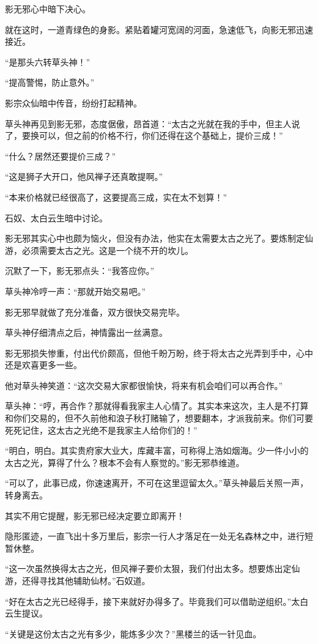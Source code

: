 \begin{this_body}
影无邪心中暗下决心。

就在这时，一道青绿色的身影。紧贴着罐河宽阔的河面，急速低飞，向影无邪迅速接近。

“是那头六转草头神！”

“提高警惕，防止意外。”

影宗众仙暗中传音，纷纷打起精神。

草头神再见到影无邪，态度倨傲，昂首道：“太古之光就在我的手中，但主人说了，要换可以，但之前的价格不行，你们还得在这个基础上，提价三成！”

“什么？居然还要提价三成？”

“这是狮子大开口，他风禅子还真敢提啊。”

“本来价格就已经很高了，这要提高三成，实在太不划算！”

石奴、太白云生暗中讨论。

影无邪其实心中也颇为恼火，但没有办法，他实在太需要太古之光了。要炼制定仙游，必须需要太古之光。这是一个绕不开的坎儿。

沉默了一下，影无邪点头：“我答应你。”

草头神冷哼一声：“那就开始交易吧。”

影无邪早就做了充分准备，双方很快交易完毕。

草头神仔细清点之后，神情露出一丝满意。

影无邪损失惨重，付出代价颇高，但他千盼万盼，终于将太古之光弄到手中，心中还是欢喜更多一些。

他对草头神笑道：“这次交易大家都很愉快，将来有机会咱们可以再合作。”

草头神：“哼，再合作？那就得看我家主人心情了。其实本来这次，主人是不打算和你们交易的，但不久前他和浪子秋打赌输了，想要翻本，才派我前来。你们可要死死记住，这太古之光绝不是我家主人给你们的！”

“明白，明白。其实贵府家大业大，库藏丰富，可称得上浩如烟海。少一件小小的太古之光，算得了什么？根本不会有人察觉的。”影无邪恭维道。

“可以了，此事已成，你速速离开，不可在这里逗留太久。”草头神最后关照一声，转身离去。

其实不用它提醒，影无邪已经决定要立即离开！

隐形匿迹，一直飞出十多万里后，影宗一行人才落足在一处无名森林之中，进行短暂休整。

“这一次虽然换得太古之光，但风禅子要价太狠，我们付出太多。想要炼出定仙游，还得寻找其他辅助仙材。”石奴道。

“好在太古之光已经得手，接下来就好办得多了。毕竟我们可以借助逆组织。”太白云生提议。

“关键是这份太古之光有多少，能炼多少次？”黑楼兰的话一针见血。


\end{this_body}
